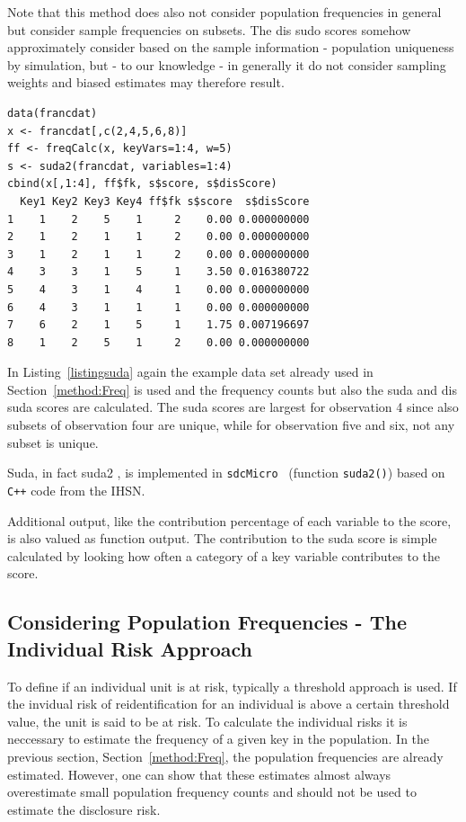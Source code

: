 \documentclass[12pt]{article}
\newcommand{\sdcMicro}{\texttt{sdcMicro}}
\begin{document}
 Note that this method does also not consider population frequencies in general but consider 
 sample frequencies on subsets. The dis sudo scores somehow approximately consider 
 based on the sample information - population uniqueness
 by simulation, but - to our knowledge - in generally it do not consider 
 sampling weights and biased estimates may therefore result.

\begin{lstlisting}[captionpos=b, caption={Example showing how to estimate suda scores.}, label=listingsuda]
data(francdat)
x <- francdat[,c(2,4,5,6,8)]
ff <- freqCalc(x, keyVars=1:4, w=5)
s <- suda2(francdat, variables=1:4)
cbind(x[,1:4], ff$fk, s$score, s$disScore)
  Key1 Key2 Key3 Key4 ff$fk s$score  s$disScore
1    1    2    5    1     2    0.00 0.000000000
2    1    2    1    1     2    0.00 0.000000000
3    1    2    1    1     2    0.00 0.000000000
4    3    3    1    5     1    3.50 0.016380722
5    4    3    1    4     1    0.00 0.000000000
6    4    3    1    1     1    0.00 0.000000000
7    6    2    1    5     1    1.75 0.007196697
8    1    2    5    1     2    0.00 0.000000000
\end{lstlisting}

In Listing~\ref{listingsuda} again the example data set already 
used in Section~\ref{method:Freq} is used
and the frequency counts but also the suda and dis suda scores are calculated. 
The suda scores are largest for observation 4 since also subsets of observation four are unique, while
for observation five and six, not any subset is unique.


Suda, in fact suda2 \citep[SUDA2,][]{manning08}, is  
 implemented in \sdcMicro~ 
  (function \lstinline{suda2()}) based on \texttt{C++} code 
  from the IHSN. %
 
Additional output, like the contribution percentage of each variable to the score, 
is also valued as function output.
The contribution to the suda 
score is simple calculated by looking how often a category of a key variable contributes to the score.
 
 


\subsection{Considering Population Frequencies - The Individual Risk Approach}\label{method:indivRisk}


To define if an individual unit is at risk, typically a threshold approach is used.
 If the invidual risk of reidentification for an individual is above a certain threshold value, 
 the unit is said to be at risk. To calculate the individual risks it is neccessary 
 to estimate the frequency 
 of a given key in the population. 
 In the previous section, Section~\ref{method:Freq}, the population frequencies are already 
estimated. However, one can show that these estimates almost always overestimate small 
population frequency counts \citep[details can be found in]{templ11book} and should not be used
to estimate the disclosure risk.
\end{document}
